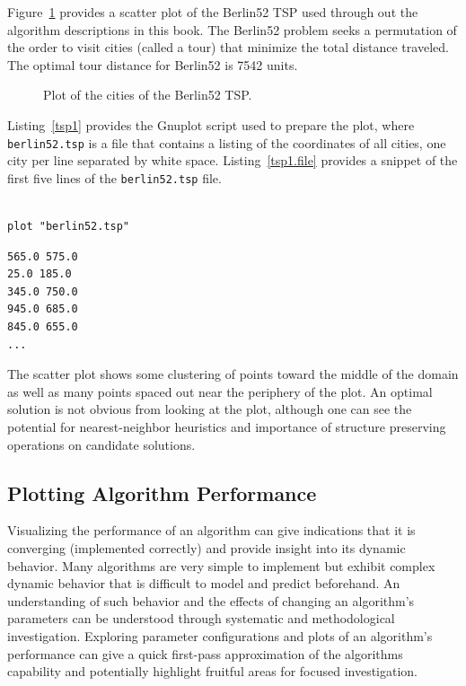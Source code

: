 Figure~\ref{plot:tsp1} provides a scatter plot of the Berlin52 TSP used through out the algorithm descriptions in this book. The Berlin52 problem seeks a permutation of the order to visit cities (called a tour) that minimize the total distance traveled. The optimal tour distance for Berlin52 is 7542 units. 

\begin{figure}[htp]
\centering

\caption{Plot of the cities of the Berlin52 TSP.}
\label{plot:tsp1}
\end{figure}

Listing~\ref{tsp1} provides the Gnuplot script used to prepare the plot, where \texttt{berlin52\-.tsp} is a file that contains a listing of the coordinates of all cities, one city per line separated by white space. Listing~\ref{tsp1.file} provides a snippet of the first five lines of the \texttt{berlin52\-.tsp} file.
\\
\\
\begin{lstlisting}[caption=Gnuplot script for plotting the Berlin52 TSP., label=tsp1]
plot "berlin52.tsp"
\end{lstlisting}

\begin{lstlisting}[caption=Snippet of the \texttt{berlin52.tsp} file., label=tsp1.file]
565.0 575.0
25.0 185.0
345.0 750.0
945.0 685.0
845.0 655.0
...
\end{lstlisting}

The scatter plot shows some clustering of points toward the middle of the domain as well as many points spaced out near the periphery of the plot. An optimal solution is not obvious from looking at the plot, although one can see the potential for nearest-neighbor heuristics and importance of structure preserving operations on candidate solutions.

%
%
\subsection{Plotting Algorithm Performance}
Visualizing the performance of an algorithm can give indications that it is converging (implemented correctly) and provide insight into its dynamic behavior. Many algorithms are very simple to implement but exhibit complex dynamic behavior that is difficult to model and predict beforehand. An understanding of such behavior and the effects of changing an algorithm's parameters can be understood through systematic and methodological investigation. Exploring parameter configurations and plots of an algorithm's performance can give a quick first-pass approximation of the algorithms capability and potentially highlight fruitful areas for focused investigation.

